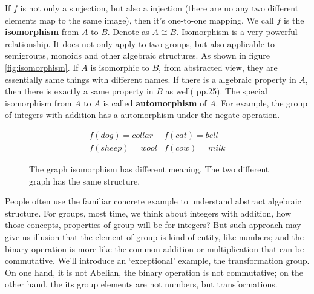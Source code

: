 \documentclass{article}
\begin{document}
If $f$ is not only a surjection, but also a injection (there are no any two different elements map to the same image), then it's one-to-one mapping. We call $f$ is the \textbf{isomorphism} from $A$ to $B$. Denote as $A \cong B$. Isomorphism is a very powerful relationship. It does not only apply to two groups, but also applicable to semigroups, monoids and other algebraic structures. As shown in figure \ref{fig:isomorphism}. If $A$ is isomorphic to $B$, from abstracted view, they are essentially same things with different names. If there is a algebraic property in $A$, then there is exactly a same property in $B$ as well(\cite{ZhangHeRui1978} pp.25). The special isomorphism from $A$ to $A$ is called \textbf{automorphism} of $A$. For example, the group of integers with addition has a automorphism under the negate operation.

\begin{figure}[htbp]
\centering
{}
\[
\begin{array}{rl}
f(dog) = collar & f(cat) = bell \\
f(sheep) = wool & f(cow) = milk
\end{array}
\]
\caption{The graph isomorphism has different meaning. The two different graph has the same structure.}
\label{fig:graph-isomorphism}
\end{figure}

People often use the familiar concrete example to understand abstract algebraic structure. For groups, most time, we think about integers with addition, how those concepts, properties of group will be for integers? But such approach may give us illusion that the element of group is kind of entity, like numbers; and the binary operation is more like the common addition or multiplication that can be commutative. We'll introduce an `exceptional' example, the transformation group. On one hand, it is not Abelian, the binary operation is not commutative; on the other hand, the its group elements are not numbers, but transformations.
\end{document}
